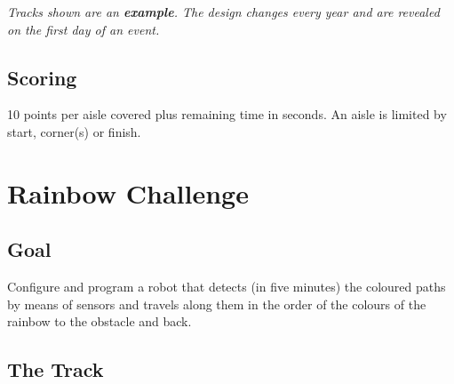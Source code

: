 \documentclass[a4paper,12pt]{article}
\begin{document}
\emph{Tracks shown are an \textbf{example}. The design changes every year and
are revealed on the first day of an event.}

\subsection{Scoring}

10 points per aisle covered plus remaining time in seconds. An aisle is limited
by start, corner(s) or finish.

\section{Rainbow Challenge}

\subsection{Goal}

Configure and program a robot that detects (in five minutes) the coloured paths
by means of sensors and travels along them in the order of the colours of the
rainbow to the obstacle and back.

\subsection{The Track}
\end{document}
